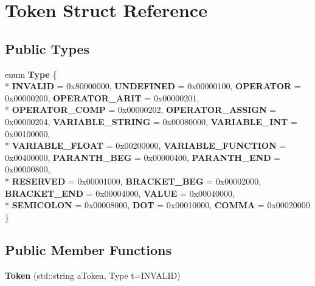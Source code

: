 \hypertarget{a00025}{\section{Token Struct Reference}
\label{a00025}
}
\subsection*{Public Types}
\begin{DoxyCompactItemize}
\item 
\hypertarget{a00025_acf70e9411196c602738c3ed2428c7137}{enum {\bfseries Type} \{ \\*
{\bfseries I\+N\+V\+A\+L\+I\+D} = 0x80000000, 
{\bfseries U\+N\+D\+E\+F\+I\+N\+E\+D} = 0x00000100, 
{\bfseries O\+P\+E\+R\+A\+T\+O\+R} = 0x00000200, 
{\bfseries O\+P\+E\+R\+A\+T\+O\+R\+\_\+\+A\+R\+I\+T} = 0x00000201, 
\\*
{\bfseries O\+P\+E\+R\+A\+T\+O\+R\+\_\+\+C\+O\+M\+P} = 0x00000202, 
{\bfseries O\+P\+E\+R\+A\+T\+O\+R\+\_\+\+A\+S\+S\+I\+G\+N} = 0x00000204, 
{\bfseries V\+A\+R\+I\+A\+B\+L\+E\+\_\+\+S\+T\+R\+I\+N\+G} = 0x00080000, 
{\bfseries V\+A\+R\+I\+A\+B\+L\+E\+\_\+\+I\+N\+T} = 0x00100000, 
\\*
{\bfseries V\+A\+R\+I\+A\+B\+L\+E\+\_\+\+F\+L\+O\+A\+T} = 0x00200000, 
{\bfseries V\+A\+R\+I\+A\+B\+L\+E\+\_\+\+F\+U\+N\+C\+T\+I\+O\+N} = 0x00400000, 
{\bfseries P\+A\+R\+A\+N\+T\+H\+\_\+\+B\+E\+G} = 0x00000400, 
{\bfseries P\+A\+R\+A\+N\+T\+H\+\_\+\+E\+N\+D} = 0x00000800, 
\\*
{\bfseries R\+E\+S\+E\+R\+V\+E\+D} = 0x00001000, 
{\bfseries B\+R\+A\+C\+K\+E\+T\+\_\+\+B\+E\+G} = 0x00002000, 
{\bfseries B\+R\+A\+C\+K\+E\+T\+\_\+\+E\+N\+D} = 0x00004000, 
{\bfseries V\+A\+L\+U\+E} = 0x00040000, 
\\*
{\bfseries S\+E\+M\+I\+C\+O\+L\+O\+N} = 0x00008000, 
{\bfseries D\+O\+T} = 0x00010000, 
{\bfseries C\+O\+M\+M\+A} = 0x00020000
 \}}\label{a00025_acf70e9411196c602738c3ed2428c7137}

\end{DoxyCompactItemize}
\subsection*{Public Member Functions}
\begin{DoxyCompactItemize}
\item 
\hypertarget{a00025_a440f7c33c975cc2bd14dfed35ab3fcea}{{\bfseries Token} (std\+::string a\+Token, Type t=I\+N\+V\+A\+L\+I\+D)}\label{a00025_a440f7c33c975cc2bd14dfed35ab3fcea}

\end{DoxyCompactItemize}
